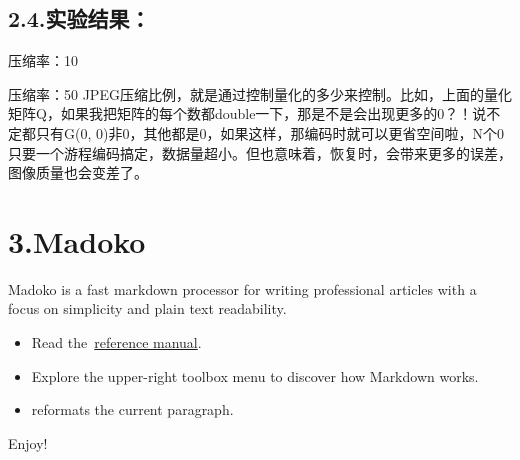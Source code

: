 \documentclass[a4paper, 12pt]{ctexart}
\begin{document}
\subsection{2.4.\hspace*{0.5em}实验结果：}\label{section}%

\noindent{}压缩率：10

压缩率：50
JPEG压缩比例，就是通过控制量化的多少来控制。比如，上面的量化矩阵Q，如果我把矩阵的每个数都double一下，那是不是会出现更多的0？！说不定都只有G(0, 0)非0，其他都是0，如果这样，那编码时就可以更省空间啦，N个0只要一个游程编码搞定，数据量超小。但也意味着，恢复时，会带来更多的误差，图像质量也会变差了。%

\section{3.\hspace*{0.5em}Madoko}\label{sec-madoko}%

\noindent{}Madoko is a fast markdown processor for writing professional articles
with a focus on simplicity and plain text readability.%

\begin{itemize}[noitemsep,topsep=\mdcompacttopsep]%

\item{}Read the~\href{http://research.microsoft.com/en-us/um/people/daan/madoko/doc/reference.html}{reference manual}.%

\item{}Explore the upper-right toolbox menu to discover how Markdown works.%

\item{} reformats the current paragraph.%
\end{itemize}%

\noindent{}Enjoy!%
\end{document}
